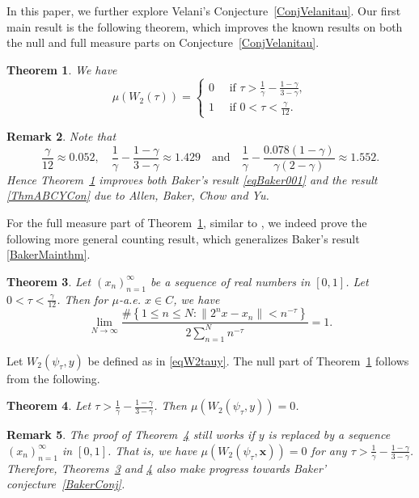 \documentclass[amssymb,amsfonts,refcheck,12pt,verbatim,righttag]{amsart}
\numberwithin{equation}{section} %
\newtheorem{thm}{Theorem}[section]
\newtheorem{rem}[thm]{Remark}
\theoremstyle{plain}
\begin{document}
In this paper, we  further explore Velani's Conjecture~\ref{ConjVelanitau}.  Our first main result is the following theorem, which improves the known results on both the null and  full measure parts on Conjecture~\ref{ConjVelanitau}. 

\begin{thm}\label{MainThm0}
We have 
\[\mu(W_2(\tau))=\begin{cases}
	0 \quad  \text{ if }\tau>\frac{1}{\gamma}-\frac{1-\gamma}{3-\gamma},\\
	1 \quad \text{ if }0<\tau<\frac{\gamma}{12}.
\end{cases}\]
\end{thm}
\begin{rem}
Note that \[\frac{\gamma}{12}\approx 0.052, \quad \frac{1}{\gamma}-\frac{1-\gamma}{3-\gamma}\approx 1.429 \quad \text{and} \quad \frac{1}{\gamma}-\frac{0.078(1-\gamma)}{\gamma(2-\gamma)} \approx1.552.\]
Hence Theorem~\ref{MainThm0} improves both Baker's result \eqref{eqBaker001} and the result \eqref{ThmABCYCon} due to Allen, Baker, Chow and Yu. 
\end{rem}

For the full measure part of Theorem~\ref{MainThm0}, similar to \cite{Baker25A}, we indeed prove the following more general counting result, which generalizes Baker's result \eqref{BakerMainthm}.

\begin{thm}\label{Mainthm}
Let $(x_{n})_{n=1}^{\infty}$ be a sequence of real numbers in $[0,1]$. Let $0<\tau<\frac{\gamma}{12}$. Then for $\mu$-a.e. $x\in C$, we have  $$\lim_{N\to\infty}\frac{\#\left\{1\leq n\leq  N:\|2^nx-x_n\|<n^{-\tau}\right\}}{2\sum_{n=1}^{N}n^{-\tau}}=1.$$ 
\end{thm}

 


Let $W_{2}(\psi_{\tau},y)$ be defined as in \eqref{eqW2tauy}. The null part of Theorem~\ref{MainThm0} follows from the following. 

\begin{thm}\label{thmconverge}
Let \(\tau>\frac{1}{\gamma}-\frac{1-\gamma}{3-\gamma}\). Then
	\(\mu (W_{2}(\psi_{\tau},y)) = 0\).
\end{thm}
\begin{rem}  
 The proof of Theorem~\ref{thmconverge} still works if $y$ is replaced by a sequence $(x_{n})_{n=1}^{\infty}$ in $[0,1]$.
	That is, we have $\mu(W_{2}(\psi_{\tau},\mathbf{x}))=0$ for any $\tau>\frac{1}{\gamma}-\frac{1-\gamma}{3-\gamma}$. Therefore, Theorems~\ref{Mainthm} and \ref{thmconverge} also make progress towards Baker' conjecture~\eqref{BakerConj}. 
\end{rem}
\end{document}
